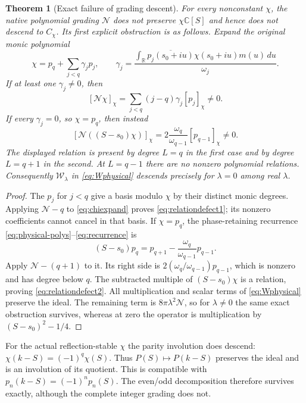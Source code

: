 \documentclass[11pt]{article}
\newtheorem{theorem}{Theorem}[section]
\newcommand{\C}{\mathbb C}\newcommand{\R}{\mathbb R}
\begin{document}
\begin{theorem}[Exact failure of grading descent]\label{thm:descent}
For every nonconstant $\chi$, the native polynomial grading
$\mathcal N$ does not preserve $\chi\C[S]$ and hence
does not descend to $C_\chi$. Its first explicit obstruction
is as follows. Expand the original monic polynomial
\begin{equation}\label{eq:chiexpand}
 \chi=p_q+\sum_{j<q}\gamma_jp_j,\qquad
 \gamma_j=\frac{\int_\R\overline{p_j(s_0+iu)}
                \chi(s_0+iu)m(u)\,du}{\omega_j}.
\end{equation}
If at least one $\gamma_j\ne0$, then
\begin{equation}\label{eq:relationdefect1}
 [\mathcal N\chi]_\chi
       =\sum_{j<q}(j-q)\gamma_j[p_j]_\chi\ne0.
\end{equation}
If every $\gamma_j=0$, so $\chi=p_q$, then instead
\begin{equation}\label{eq:relationdefect2}
 [\mathcal N((S-s_0)\chi)]_\chi
       =2\frac{\omega_q}{\omega_{q-1}}[p_{q-1}]_\chi\ne0.
\end{equation}
The displayed relation is present by degree $L=q$ in the
first case and by degree $L=q+1$ in the second.
At $L=q-1$ there are no nonzero polynomial relations.
Consequently $\mathcal W_\lambda$ in
\eqref{eq:Wphysical} descends precisely for $\lambda=0$
among real $\lambda$.
\end{theorem}
\begin{proof}
The $p_j$ for $j<q$ give a basis modulo $\chi$ by their
distinct monic degrees. Applying $\mathcal N-q$ to
\eqref{eq:chiexpand} proves \eqref{eq:relationdefect1};
its nonzero coefficients cannot cancel in that basis.
If $\chi=p_q$, the phase-retaining recurrence
\eqref{eq:physical-polys}--\eqref{eq:recurrence} is
\[
 (S-s_0)p_q=p_{q+1}
                 -\frac{\omega_q}{\omega_{q-1}}p_{q-1}.
\]
Apply $\mathcal N-(q+1)$ to it. Its right side is
$2(\omega_q/\omega_{q-1})p_{q-1}$, which is nonzero
and has degree below $q$. The subtracted multiple
of $(S-s_0)\chi$ is a relation, proving
\eqref{eq:relationdefect2}.
All multiplication and scalar terms of
\eqref{eq:Wphysical} preserve the ideal. The remaining
term is $8\pi\lambda^2\mathcal N$, so for $\lambda\ne0$
the same exact obstruction survives, whereas at zero
the operator is multiplication by $(S-s_0)^2-1/4$.
\end{proof}

For the actual reflection-stable $\chi$ the parity
involution does descend: $\chi(k-S)=(-1)^q\chi(S)$.
Thus $P(S)\mapsto P(k-S)$ preserves the ideal and is
an involution of its quotient. This is compatible
with $p_n(k-S)=(-1)^np_n(S)$.
The even/odd decomposition therefore survives exactly,
although the complete integer grading does not.
\end{document}
